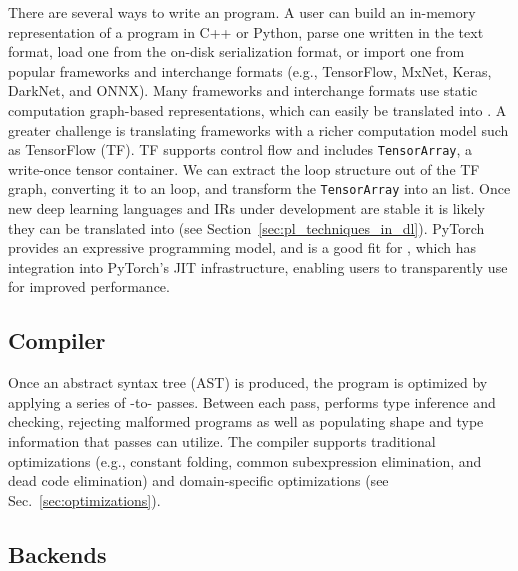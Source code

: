 There are several ways to write an \relay program.
A user can build an in-memory representation of
  a program in C++ or Python,
  parse one written in the \relay text format,
  load one from the on-disk serialization format,
  or import one from popular frameworks and interchange formats
    (e.g., TensorFlow, MxNet, Keras, DarkNet, and ONNX).
Many frameworks and interchange formats use static computation graph-based representations,
  which can easily be translated into \relay.
A greater challenge is translating frameworks
  with a richer computation model such as TensorFlow (TF).
TF supports control flow and includes \verb|TensorArray|, a write-once
  tensor container.
We can extract the loop structure out of the TF graph, converting
  it to an \relay loop, and transform the \verb|TensorArray| into an \relay list.
Once new deep learning languages and IRs under development
  are stable it is likely they can be translated into \relay (see
  Section~\ref{sec:pl_techniques_in_dl}).
PyTorch provides an expressive programming model, and is a good fit
  for \relay, which has integration into PyTorch's JIT infrastructure,
  enabling users to transparently use \relay for improved performance.

\subsection*{Compiler}
Once an \relay abstract syntax tree (AST) is produced,
  the program is optimized by applying a series of \relay-to-\relay
  passes.
Between each pass, \relay performs type inference and checking,
  rejecting malformed programs as well as populating shape and type
  information that passes can utilize.
The \relay compiler supports traditional optimizations
  (e.g., constant folding, common subexpression elimination, and dead code elimination)
  and domain-specific optimizations
  (see Sec.~\ref{sec:optimizations}).

\subsection*{Backends}

